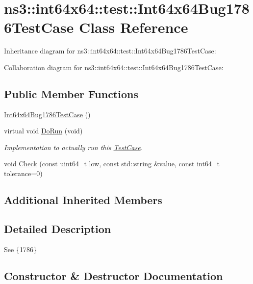 \hypertarget{classns3_1_1int64x64_1_1test_1_1Int64x64Bug1786TestCase}{}\section{ns3\+:\+:int64x64\+:\+:test\+:\+:Int64x64\+Bug1786\+Test\+Case Class Reference}
\label{classns3_1_1int64x64_1_1test_1_1Int64x64Bug1786TestCase}


Inheritance diagram for ns3\+:\+:int64x64\+:\+:test\+:\+:Int64x64\+Bug1786\+Test\+Case\+:


Collaboration diagram for ns3\+:\+:int64x64\+:\+:test\+:\+:Int64x64\+Bug1786\+Test\+Case\+:
\subsection*{Public Member Functions}
\begin{DoxyCompactItemize}
\item 
\hyperlink{classns3_1_1int64x64_1_1test_1_1Int64x64Bug1786TestCase_ac7f8945657f6fa3769f6c348fcbdfb68}{Int64x64\+Bug1786\+Test\+Case} ()
\item 
virtual void \hyperlink{classns3_1_1int64x64_1_1test_1_1Int64x64Bug1786TestCase_ad809fe2f4356ebcb13f7205dfd2200b7}{Do\+Run} (void)
\begin{DoxyCompactList}\small\item\em Implementation to actually run this \hyperlink{classns3_1_1TestCase}{Test\+Case}. \end{DoxyCompactList}\item 
void \hyperlink{classns3_1_1int64x64_1_1test_1_1Int64x64Bug1786TestCase_aa4b4b833335ea1266a4f7f5f0e314b5b}{Check} (const uint64\+\_\+t low, const std\+::string \&value, const int64\+\_\+t tolerance=0)
\end{DoxyCompactItemize}
\subsection*{Additional Inherited Members}


\subsection{Detailed Description}
See \{1786\} 

\subsection{Constructor \& Destructor Documentation}
